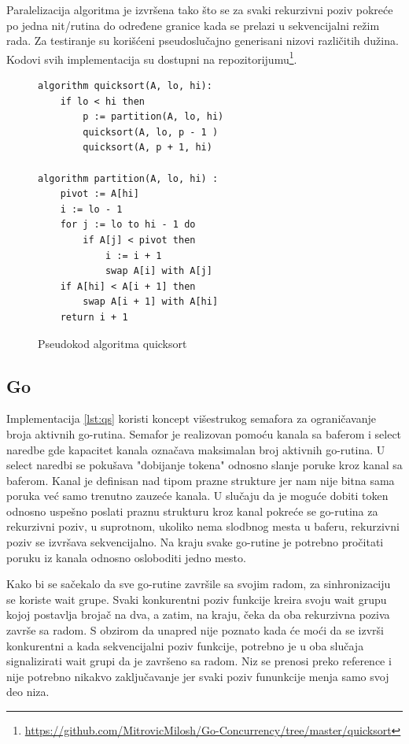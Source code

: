 \documentclass[12pt,oneside]{memoir}
\begin{document}
Paralelizacija algoritma je izvršena tako što se za svaki rekurzivni poziv pokreće po jedna nit/rutina do određene granice kada se prelazi u sekvencijalni režim rada. Za testiranje su korišćeni pseudoslučajno generisani nizovi različitih dužina. Kodovi svih implementacija su dostupni na repozitorijumu\footnote{\url{https://github.com/MitrovicMilosh/Go-Concurrency/tree/master/quicksort}}.

\begin{figure}
\begin{center}

\begin{Verbatim}[fontsize=\small]
algorithm quicksort(A, lo, hi):
    if lo < hi then
        p := partition(A, lo, hi)
        quicksort(A, lo, p - 1 )
        quicksort(A, p + 1, hi)

algorithm partition(A, lo, hi) :
    pivot := A[hi]
    i := lo - 1    
    for j := lo to hi - 1 do
        if A[j] < pivot then
            i := i + 1
            swap A[i] with A[j]
    if A[hi] < A[i + 1] then
        swap A[i + 1] with A[hi]
    return i + 1
\end{Verbatim}

\caption{Pseudokod algoritma quicksort}
\label{fig:qs_pseudo}
\end{center}
\end{figure}


\subsection{Go}
\label{qs:go}
Implementacija \ref{lst:qs} koristi koncept višestrukog semafora za ograničavanje broja aktivnih go-rutina. Semafor je realizovan pomoću kanala sa baferom i select naredbe gde kapacitet kanala označava maksimalan broj aktivnih go-rutina. U select naredbi se pokušava "dobijanje tokena" odnosno slanje poruke kroz kanal sa baferom. Kanal je definisan nad tipom prazne strukture jer nam nije bitna sama poruka već samo trenutno zauzeće kanala. U slučaju da je moguće dobiti token odnosno uspešno poslati praznu strukturu kroz kanal pokreće se go-rutina za rekurzivni poziv, u suprotnom, ukoliko nema slodbnog mesta u baferu, rekurzivni poziv se izvršava sekvencijalno. Na kraju svake go-rutine je potrebno pročitati poruku iz kanala odnosno osloboditi jedno mesto.

 Kako bi se sačekalo da sve go-rutine završile sa svojim radom, za sinhronizaciju se koriste wait grupe. Svaki konkurentni poziv funkcije kreira svoju wait grupu kojoj postavlja brojač na dva, a zatim, na kraju, čeka da oba rekurzivna poziva završe sa radom. S obzirom da unapred nije poznato kada će moći da se izvrši konkurentni a kada sekvencijalni poziv funkcije, potrebno je u oba slučaja signalizirati wait grupi da je završeno sa radom. Niz se prenosi preko reference i nije potrebno nikakvo zaključavanje jer svaki poziv fununkcije menja samo svoj deo niza.
\end{document}

